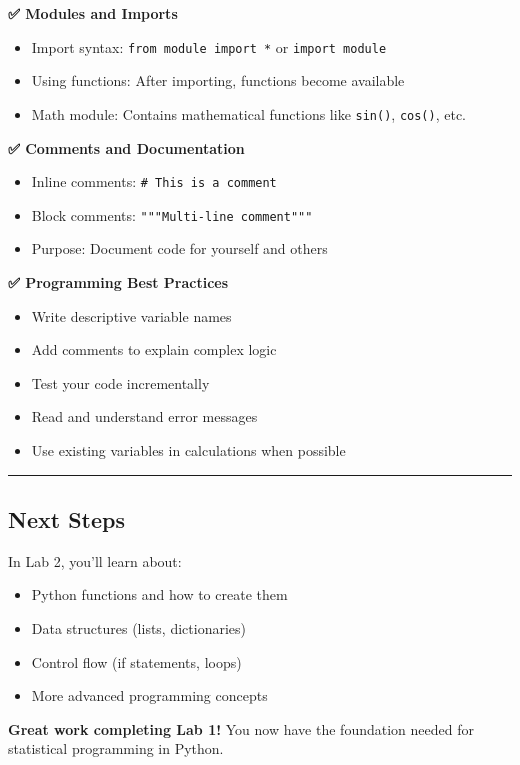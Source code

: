 \documentclass[
  11pt,
]{article}
\begin{document}
\textbf{✅ Modules and Imports}

\begin{itemize}
\item
  Import syntax: \texttt{from\ module\ import\ *} or
  \texttt{import\ module}
\item
  Using functions: After importing, functions become available
\item
  Math module: Contains mathematical functions like \texttt{sin()},
  \texttt{cos()}, etc.
\end{itemize}

\textbf{✅ Comments and Documentation}

\begin{itemize}
\item
  Inline comments: \texttt{\#\ This\ is\ a\ comment}
\item
  Block comments: \texttt{"""Multi-line\ comment"""}
\item
  Purpose: Document code for yourself and others
\end{itemize}

\textbf{✅ Programming Best Practices}

\begin{itemize}
\item
  Write descriptive variable names
\item
  Add comments to explain complex logic
\item
  Test your code incrementally
\item
  Read and understand error messages
\item
  Use existing variables in calculations when possible
\end{itemize}

\begin{center}\rule{0.5\linewidth}{0.5pt}\end{center}

\subsection{Next Steps}\label{next-steps}

In Lab 2, you'll learn about:

\begin{itemize}
\item
  Python functions and how to create them
\item
  Data structures (lists, dictionaries)
\item
  Control flow (if statements, loops)
\item
  More advanced programming concepts
\end{itemize}

\textbf{Great work completing Lab 1!} You now have the foundation needed
for statistical programming in Python.
\end{document}
